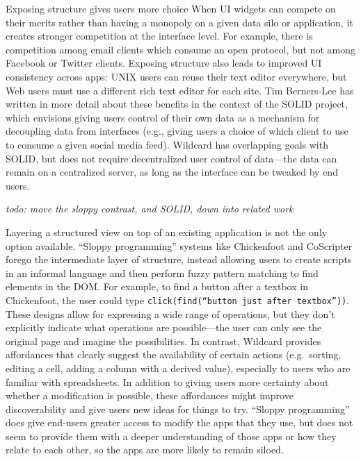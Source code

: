 \documentclass[english,submission]{programming}
\begin{document}
Exposing structure gives users more choice When UI widgets can compete
on their merits rather than having a monopoly on a given data silo or
application, it creates stronger competition at the interface level. For
example, there is competition among email clients which consume an open
protocol, but not among Facebook or Twitter clients. Exposing structure
also leads to improved UI consistency across apps: UNIX users can reuse
their text editor everywhere, but Web users must use a different rich
text editor for each site. Tim Berners-Lee has written in more detail
about these benefits \autocite{berners-lee2018} in the context of the
SOLID project, which envisions giving users control of their own data as
a mechanism for decoupling data from interfaces (e.g., giving users a
choice of which client to use to consume a given social media feed).
Wildcard has overlapping goals with SOLID, but does not require
decentralized user control of data---the data can remain on a
centralized server, as long as the interface can be tweaked by end
users.

\emph{todo: move the sloppy contrast, and SOLID, down into related work}

Layering a structured view on top of an existing application is not the
only option available. ``Sloppy programming'' systems like Chickenfoot
\autocite{bolin2005} and CoScripter \autocite{leshed2008} forego the
intermediate layer of structure, instead allowing users to create
scripts in an informal language and then perform fuzzy pattern matching
to find elements in the DOM. For example, to find a button after a
textbox in Chickenfoot, the user could type
\texttt{click(find(“button\ just\ after\ textbox”))}. These designs
allow for expressing a wide range of operations, but they don't
explicitly indicate what operations are possible---the user can only see
the original page and imagine the possibilities. In contrast, Wildcard
provides affordances that clearly suggest the availability of certain
actions (e.g.~sorting, editing a cell, adding a column with a derived
value), especially to users who are familiar with spreadsheets. In
addition to giving users more certainty about whether a modification is
possible, these affordances might improve discoverability and give users
new ideas for things to try. ``Sloppy programming'' does give end-users
greater access to modify the apps that they use, but does not seem to
provide them with a deeper understanding of those apps or how they
relate to each other, so the apps are more likely to remain siloed.
\end{document}
